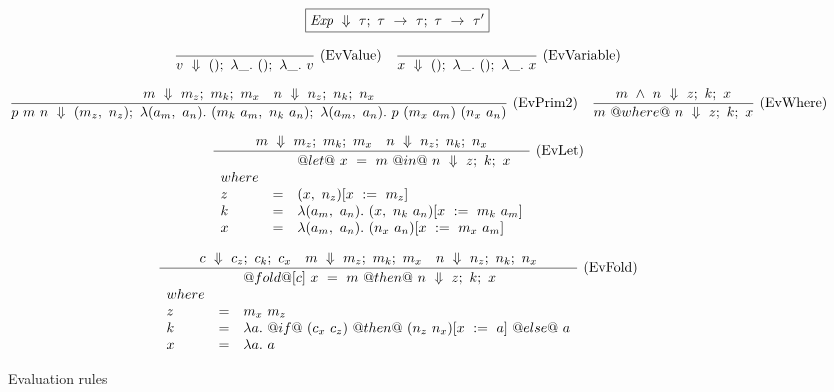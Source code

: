 
\newcommand\LamX[1] {\lambda{} #1.~}
\newcommand\LamU {\LamX{\_}}

\newcommand\LamXX[2] {\lambda{} #1~#2.~}
\newcommand\LamUU {\LamXX{\_}{\_}}

\begin{figure*}

$$
\boxed{\mathit{Exp} ~\Downarrow~ \tau;~\tau~\to~\tau;~\tau~\to~\tau'}
$$

$$
\ruleI
{
}
{
    \Bigstep{v}{()}{\LamU ()}{\LamU v}
}
\textrm{(EvValue)}
\quad
\ruleI
{
}
{
    \Bigstep{x}{()}{\LamU ()}{\LamU x}
}
\textrm{(EvVariable)}
$$

$$
\ruleI
{
    \Bigstep{m}{m_z}{m_k}{m_x}
    \quad
    \Bigstep{n}{n_z}{n_k}{n_x}
}
{
    \Bigstep{p~m~n}{(m_z,~n_z)}{\LamX{(a_m,~a_n)} (m_k~a_m,~n_k~a_n)}{\LamX{(a_m,~a_n)} p~(m_x~a_m)~(n_x~a_n)}
}
\textrm{(EvPrim2)}
\quad
\ruleI
{
    \Bigstep{m~\wedge~n}{z}{k}{x}
}
{
    \Bigstep{m~@where@~n}{z}{k}{x}
}
\textrm{(EvWhere)}
$$

$$
\ruleI
{
    \Bigstep{m}{m_z}{m_k}{m_x}
    \quad
    \Bigstep{n}{n_z}{n_k}{n_x}
}
{
    \begin{array}{lcl}
    & & \Bigstep{@let@~x~=~m~@in@~n}{z}{k}{x}
    \\
    \mit{where}
    \\
    z & = & (x,~n_z)[x~:=~m_z]
    \\
    k & = & \LamX{(a_m,~a_n)} (x,~n_k~a_n)[x~:=~m_k~a_m]
    \\
    x & = & \LamX{(a_m,~a_n)} (n_x~a_n)[x~:=~m_x~a_m]
    \end{array}
}
\textrm{(EvLet)}
$$

$$
\ruleI
{
    \Bigstep{c}{c_z}{c_k}{c_x}
    \quad
    \Bigstep{m}{m_z}{m_k}{m_x}
    \quad
    \Bigstep{n}{n_z}{n_k}{n_x}
}
{
    \begin{array}{lcl}
    & & \Bigstep{@fold@[c]~x~=~m~@then@~n}{z}{k}{x}
    \\
    \mit{where}
    \\
    z & = & m_x~m_z
    \\
    k & = & \LamX{a} @if@~(c_x~c_z)~@then@~(n_z~n_x)[x~:=~a]~@else@~a
    \\
    x & = & \LamX{a} a
    \end{array}
}
\textrm{(EvFold)}
$$







\caption{Evaluation rules}
\label{fig:source:eval}
\end{figure*}


